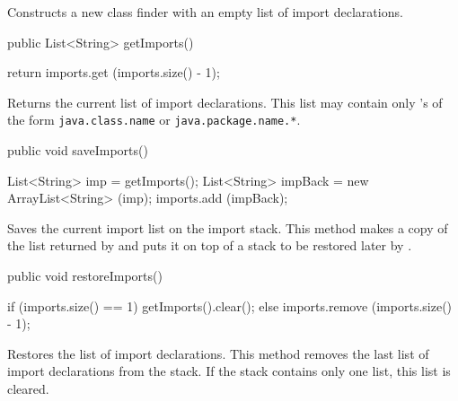 \begin{tabb}   Constructs a new class finder with
 an empty list of import declarations.
\end{tabb}
\begin{code}

   public List<String> getImports()\begin{hide} {
      return imports.get (imports.size() - 1);
   }\end{hide}
\end{code}
\begin{tabb}   Returns the current list of import declarations.
 This list may contain only 's
 of the form \texttt{java.class.name} or
 \texttt{java.package.name.*}.
\end{tabb}
\begin{htmlonly}
\end{htmlonly}
\begin{code}

   public void saveImports()\begin{hide} {
      List<String> imp = getImports();
      List<String> impBack = new ArrayList<String> (imp);
      imports.add (impBack);
   }\end{hide}
\end{code}
\begin{tabb}   Saves the current import list on the import stack.
 This method makes a copy of the list returned
 by  and puts it on top
 of a stack to be restored later by
 .
\end{tabb}
\begin{code}

   public void restoreImports()\begin{hide} {
      if (imports.size() == 1)
         getImports().clear();
      else
         imports.remove (imports.size() - 1);
   }\end{hide}
\end{code}
\begin{tabb}   Restores the list of import declarations.
 This method removes the last list of import
 declarations from the stack. If the stack
 contains only one list, this list is cleared.
\end{tabb}

